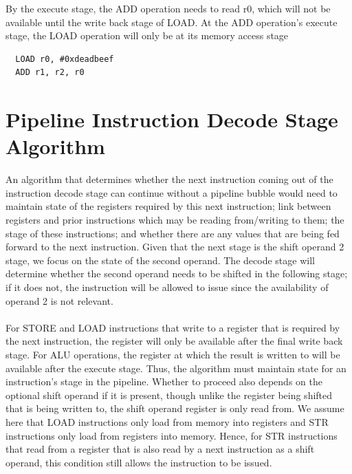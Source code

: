 \documentclass[a4paper, 12pt, oneside]{book}
\begin{document}
By the execute stage, the ADD operation needs to read r0, which will not be available until the write back stage of LOAD. At the ADD operation's execute stage, the LOAD operation will only be at its memory access stage
\begin{verbatim}
  LOAD r0, #0xdeadbeef
  ADD r1, r2, r0
\end{verbatim}

\section{Pipeline Instruction Decode Stage Algorithm}

An algorithm that determines whether the next instruction coming out of the instruction decode stage can continue without a pipeline bubble would need to maintain state of the registers required by this next instruction; link between registers and prior instructions which may be reading from/writing to them; the stage of these instructions; and whether there are any values that are being fed forward to the next instruction. Given that the next stage is the shift operand 2 stage, we focus on the state of the second operand. The decode stage will determine whether the second operand needs to be shifted in the following stage; if it does not, the instruction will be allowed to issue since the availability of operand 2 is not relevant.\\
\\
For STORE and LOAD instructions that write to a register that is required by the next instruction, the register will only be available after the final write back stage. For ALU operations, the register at which the result is written to will be available after the execute stage. Thus, the algorithm must maintain state for an instruction's stage in the pipeline. Whether to proceed also depends on the optional shift operand if it is present, though unlike the register being shifted that is being written to, the shift operand register is only read from. We assume here that LOAD instructions only load from memory into registers and STR instructions only load from registers into memory. Hence, for STR instructions that read from a register that is also read by a next instruction as a shift operand, this condition still allows the instruction to be issued.
\end{document}
